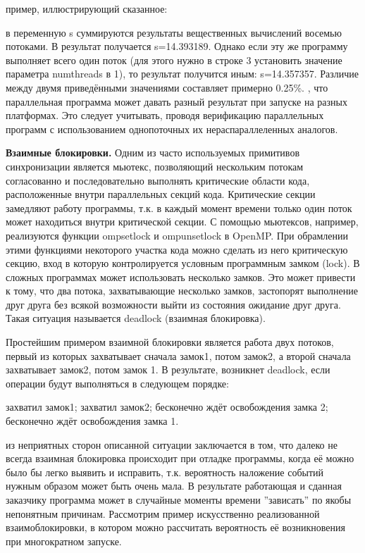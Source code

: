 {	 пример, иллюстрирующий сказанное:
	\begin{figure}[H]
		
	\end{figure}
	 в переменную s суммируются результаты вещественных вычислений восемью потоками. В результат получается s=14.393189. Однако если эту же программу выполняет всего один поток (для этого нужно в строке 3 установить значение параметра num\textunderscore threads в 1), то результат получится иным: s=14.357357. Различие между двумя приведёнными значениями составляет примерно 0.25\%. 
	, что параллельная программа может давать разный результат при запуске на разных платформах. Это следует учитывать, проводя верификацию параллельных программ с использованием однопоточных их нераспараллеленных аналогов.
	\par\textbf{Взаимные блокировки.} Одним из часто используемых примитивов синхронизации является мьютекс, позволяющий нескольким потокам согласованно и последовательно выполнять критические области кода, расположенные внутри параллельных секций кода. Критические секции замедляют работу программы, т.к. в каждый момент времени только один поток может находиться внутри критической секции. С помощью мьютексов, например, реализуются функции omp\textunderscore set\textunderscore lock и omp\textunderscore unset\textunderscore lock в OpenMP. При обрамлении этими функциями некоторого участка кода можно сделать из него критическую секцию, вход в которую контролируется условным программным замком (lock). В сложных программах может использовать несколько замков. Это может привести к тому, что два потока, захватывающие несколько замков, застопорят выполнение друг друга без всякой возможности выйти из состояния ожидание друг друга. Такая ситуация называется deadlock (взаимная блокировка).
	\par Простейшим примером взаимной блокировки является работа двух потоков, первый из которых захватывает сначала замок1, потом замок2, а второй сначала захватывает замок2, потом замок 1. В результате, возникнет deadlock, если операции будут выполняться в следующем порядке: 
	\begin{itemize}
		 захватил замок1;
		 захватил замок2;
		 бесконечно ждёт освобождения замка 2;
		 бесконечно ждёт освобождения замка 1.
	\end{itemize}
	 из неприятных сторон описанной ситуации заключается в том, что далеко не всегда взаимная блокировка происходит при отладке программы, когда её можно было бы легко выявить и исправить, т.к. вероятность наложение событий нужным образом может быть очень мала. В результате работающая и сданная заказчику программа может в случайные моменты времени ''зависать'' по якобы непонятным причинам. Рассмотрим пример искусственно реализованной взаимоблокировки, в котором можно рассчитать вероятность её возникновения при многократном запуске.
}

